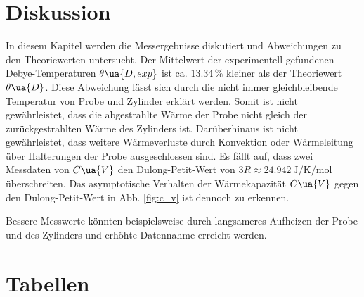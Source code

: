 \section{Diskussion}
\label{sec:diskussion}

In diesem Kapitel werden die Messergebnisse diskutiert und Abweichungen zu den Theoriewerten untersucht.
Der Mittelwert der experimentell gefundenen Debye-Temperaturen $\theta\ua{D, exp}$ ist ca.
$\num{13.34}\,\%$ kleiner als der Theoriewert $\theta\ua{D}$.
Diese Abweichung lässt sich durch die nicht immer gleichbleibende Temperatur von Probe und Zylinder
erklärt werden. Somit ist nicht gewährleistet, dass die abgestrahlte Wärme der Probe nicht gleich der
zurückgestrahlten Wärme des Zylinders ist.
Darüberhinaus ist nicht gewährleistet, dass weitere Wärmeverluste durch Konvektion oder
Wärmeleitung über Halterungen der Probe ausgeschlossen sind.
Es fällt auf, dass zwei Messdaten von $C\ua{V}$ den Dulong-Petit-Wert von
$3R \approx \SI{24.942}{\joule\per\kelvin\per\mol}$ überschreiten.
Das asymptotische Verhalten der Wärmekapazität $C\ua{V}$ gegen den
Dulong-Petit-Wert in Abb. \ref{fig:c_v} ist dennoch zu erkennen.

Bessere Messwerte könnten beispielsweise durch langsameres Aufheizen der Probe und des Zylinders und
erhöhte Datennahme erreicht werden.
\newpage
\pagestyle{empty}
\section{Tabellen}
\label{sec:tabellen}



